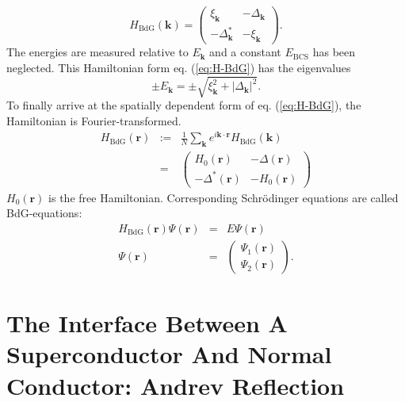 \begin{equation}
H_\text{BdG}\left(\mathbf{k} \right) = \begin{pmatrix}
\xi_\mathbf{k} &  - \Delta_\mathbf{k}\\
- \Delta^*_\mathbf{k} & - \xi_\mathbf{k}
\end{pmatrix} \label{eq:H-BdG}.
\end{equation}
The energies are measured relative to $E_\mathbf{k}$ and a constant $E_\text{BCS}$ has been neglected.
This Hamiltonian form eq. (\ref{eq:H-BdG}) has the eigenvalues
\begin{equation}
 \pm E_\mathbf{k} = \pm \sqrt{\xi_\mathbf{k}^2 + |\Delta_\mathbf{k}|^2  }.
\end{equation}
To finally arrive at the spatially dependent form of eq. (\ref{eq:H-BdG}), the Hamiltonian is Fourier-transformed.
\begin{eqnarray}
H_\text{BdG} \left( \mathbf{r} \right) &:=& \frac{1}{N} \sum_\mathbf{k} e^{i \mathbf{k \cdot r}} H_\text{BdG}\left( \mathbf{k} \right) \\
&=& \begin{pmatrix}
H_0\left( \mathbf{r} \right)  &  - \Delta \left( \mathbf{r} \right) \\
- \Delta^* \left( \mathbf{r} \right)  & - H_0 \left( \mathbf{r} \right) 
\end{pmatrix} \label{eq:H-BdG-r}
\end{eqnarray}
$H_0 \left( \mathbf{r} \right) $ is the free Hamiltonian. Corresponding Schr\"odinger equations are called BdG-equations:
\begin{eqnarray}
H_\text{BdG} \left( \mathbf{r} \right) \Psi\left( \mathbf{r} \right) &=& E \Psi\left( \mathbf{r} \right)\label{eq:BdG-eq} \\
\Psi\left( \mathbf{r} \right)  &=& \begin{pmatrix}
\Psi_1\left( \mathbf{r} \right) \\ \Psi_2\left( \mathbf{r} \right) 
\end{pmatrix}.\label{eq:BdG-spinor}
\end{eqnarray}

\section{The Interface Between A Superconductor And Normal Conductor: Andrev Reflection}\label{sec:NS}

